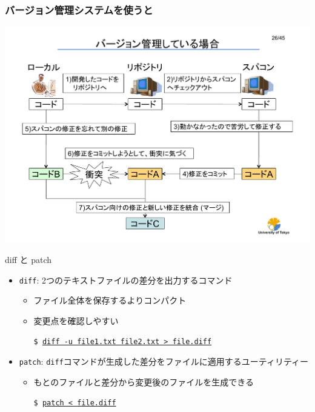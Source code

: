 \begin{frame}
  \frametitle{バージョン管理システムを使うと}
  \begin{center}
    \includegraphics[height=0.78\textheight]{pattern-2.pdf}
  \end{center}
\end{frame}

\begin{frame}[t,fragile]{diff と patch}
  \begin{itemize}
    \setlength{\itemsep}{1em}
  \item {\tt diff}: 2つのテキストファイルの差分を出力するコマンド
    \begin{itemize}
    \item ファイル全体を保存するよりコンパクト
    \item 変更点を確認しやすい
      
      {\tt \$ \underline{diff -u file1.txt file2.txt > file.diff}}
    \end{itemize}
  \item {\tt patch}: {\tt diff}コマンドが生成した差分をファイルに適用するユーティリティー
    \begin{itemize}
    \item もとのファイルと差分から変更後のファイルを生成できる

      {\tt \$ \underline{patch < file.diff}}
    \end{itemize}
  \end{itemize}
\end{frame}

